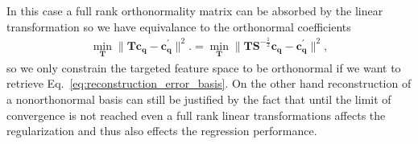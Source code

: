 In this case a full rank orthonormality matrix can be absorbed by the linear transformation so we have equivalance to the orthonormal coefficients
\begin{subequations}
\begin{align}
  \min_\mathbf{T} \|\mathbf{T}\mathbf{c}_\mathbf{q} - \mathbf{c}^\prime_\mathbf{q}\|^2.
    = \min_\mathbf{T} \|\mathbf{T}\mathbf{S}^{-\frac12}\mathbf{c}_\mathbf{q} - \mathbf{c}^\prime_\mathbf{q}\|^2,
\end{align}
\end{subequations}
so we only constrain the targeted feature space to be orthonormal if we want to retrieve Eq.~\ref{eq:reconstruction_error_basis}.
On the other hand reconstruction of a nonorthonormal basis can still be justified by the fact that until the limit of convergence is not reached even a full rank linear transformations affects the regularization and thus also effects the regression performance.

